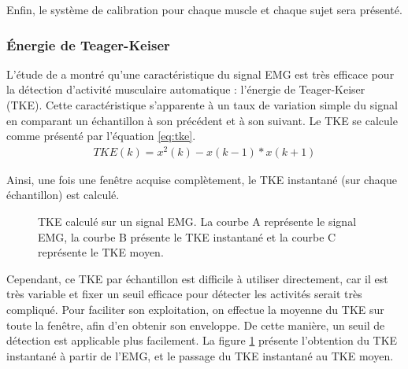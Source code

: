 \documentclass[letterpaper, twoside, 12pt, memoire, creativecommons, hyperref]{thETS}
\begin{document}
Enfin, le système de calibration pour chaque muscle et chaque sujet sera présenté.

\subsubsection{Énergie de Teager-Keiser}
\label{CHtke}

L'étude de \cite{li2007} a montré qu'une caractéristique du signal EMG est très efficace pour la détection d'activité musculaire automatique : l'énergie de Teager-Keiser (TKE). Cette caractéristique s'apparente à un taux de variation simple du signal en comparant un échantillon à son précédent et à son suivant. Le TKE se calcule comme présenté par l'équation \ref{eq:tke}.
\begin{align}\label{eq:tke}
   TKE(k) = x^2(k) - x(k-1)*x(k+1) 
\end{align}

Ainsi, une fois une fenêtre acquise complètement, le TKE instantané (sur chaque échantillon) est calculé. 

\begin{figure}
	\centering
	\caption{TKE calculé sur un signal EMG. La courbe A représente le signal EMG, la courbe B présente le TKE instantané et la courbe C représente le TKE moyen.}
	\label{fig:tkeinstant}
\end{figure}

Cependant, ce TKE par échantillon est difficile à utiliser directement, car il est très variable et fixer un seuil efficace pour détecter les activités serait très compliqué. Pour faciliter son exploitation, on effectue la moyenne du TKE sur toute la fenêtre, afin d'en obtenir son enveloppe. De cette manière, un seuil de détection est applicable plus facilement. La figure \ref{fig:tkeinstant} présente l'obtention du TKE instantané à partir de l'EMG, et le passage du TKE instantané au TKE moyen.
\end{document}
